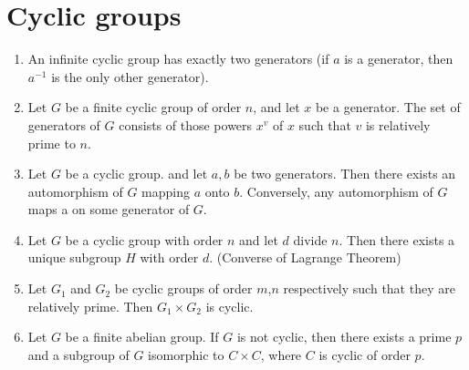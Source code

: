 \documentclass[main.tex]{subfiles}
\begin{document}
\section{Cyclic groups}

\begin{theorem}
 	
	\begin{enumerate}
	\item An infinite cyclic group has exactly two generators (if $a$ is a generator, then $a^{-1}$ is the only other generator).
	\item Let $G$ be a finite cyclic group of order $n$, and let $x$ be a generator. The set of generators of $G$ consists of those powers $x^v$ of $x$ such that $v$ is relatively prime to $n$.
	\item Let $G$ be a cyclic group. and let $a,b$ be two generators. Then there exists an automorphism of $G$ mapping $a$ onto $b$. Conversely, any automorphism of $G$ maps a on some generator of $G$.
	\item Let $G$ be a cyclic group with order $n$ and let $d$ divide $n$. Then there exists a unique subgroup $H$ with order $d$. (Converse of Lagrange Theorem)
	\item Let $G_1$ and $G_2$ be cyclic groups of order $m$,$n$ respectively such that they are relatively prime. Then $G_1 \times G_2$ is cyclic. 
	\item Let $G$ be a finite abelian group. If $G$ is not cyclic, then there exists a prime $p$ and a subgroup of $G$ isomorphic to $C \times C$, where $C$ is cyclic of order $p$.
	\end{enumerate}

\end{theorem}
\end{document}
